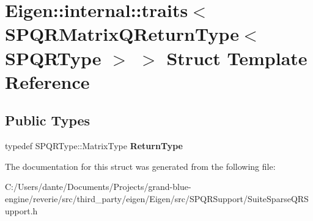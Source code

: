 \hypertarget{struct_eigen_1_1internal_1_1traits_3_01_s_p_q_r_matrix_q_return_type_3_01_s_p_q_r_type_01_4_01_4}{}\section{Eigen\+::internal\+::traits$<$ S\+P\+Q\+R\+Matrix\+Q\+Return\+Type$<$ S\+P\+Q\+R\+Type $>$ $>$ Struct Template Reference}
\label{struct_eigen_1_1internal_1_1traits_3_01_s_p_q_r_matrix_q_return_type_3_01_s_p_q_r_type_01_4_01_4}
\subsection*{Public Types}
\begin{DoxyCompactItemize}
\item 
\mbox{\label{struct_eigen_1_1internal_1_1traits_3_01_s_p_q_r_matrix_q_return_type_3_01_s_p_q_r_type_01_4_01_4_a7e131606cb1aaabe1ffa494e9ca2fa91}} 
typedef S\+P\+Q\+R\+Type\+::\+Matrix\+Type {\bfseries Return\+Type}
\end{DoxyCompactItemize}


The documentation for this struct was generated from the following file\+:\begin{DoxyCompactItemize}
\item 
C\+:/\+Users/dante/\+Documents/\+Projects/grand-\/blue-\/engine/reverie/src/third\+\_\+party/eigen/\+Eigen/src/\+S\+P\+Q\+R\+Support/Suite\+Sparse\+Q\+R\+Support.\+h\end{DoxyCompactItemize}
